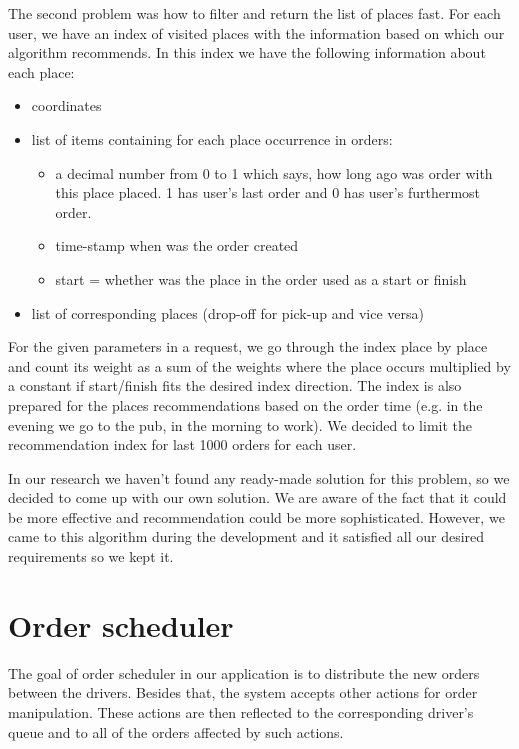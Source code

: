  The second problem was how to filter and return the list of places fast. For each user, we have an index of visited places with the information based on which our algorithm recommends. In this index we have the following information about each place:
 \begin{itemize}
 	\item coordinates
 	\item list of items containing for each place occurrence in orders:
 	\begin{itemize}
 		\item a decimal number from 0 to 1 which says, how long ago was order with this place placed. 1 has user's last order and 0 has user's furthermost order.
 		\item time-stamp when was the order created
 		\item start = whether was the place in the order used as a start or finish
 	\end{itemize}
 	\item list of corresponding places (drop-off for pick-up and vice versa)
 \end{itemize}
For the given parameters in a request, we go through the index place by place and count its weight as a sum of the weights where the place occurs multiplied by a constant if start/finish fits the desired index direction. The index is also prepared for the places recommendations based on the order time (e.g. in the evening we go to the pub, in the morning to work). We decided to limit the recommendation index for last 1000 orders for each user.

In our research we haven't found any ready-made solution for this problem, so we decided to come up with our own solution. We are aware of the fact that it could be more effective and recommendation could be more sophisticated. However, we came to this algorithm during the development and it satisfied all our desired requirements so we kept it.

\section {Order scheduler}

The goal of order scheduler in our application is to distribute the new orders between the drivers. Besides that, the system accepts other actions for order manipulation. These actions are then reflected to the corresponding driver's queue and to all of the orders affected by such actions.

